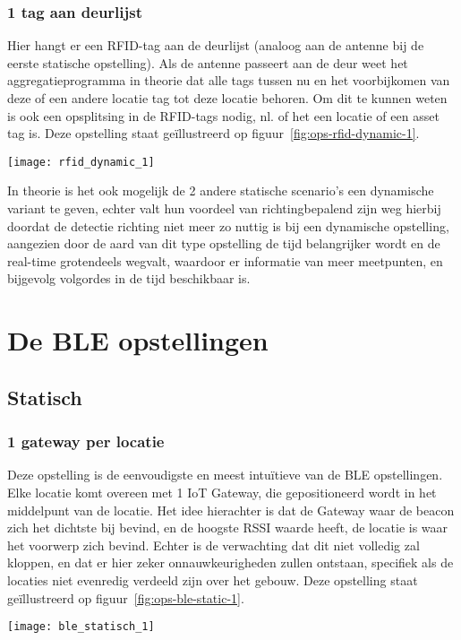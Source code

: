 \subsubsection{1 tag aan deurlijst}
\begin{minipage}{0.65\textwidth}
Hier hangt er een RFID-tag aan de deurlijst (analoog aan de antenne bij de eerste statische opstelling). Als de antenne passeert aan de deur weet het aggregatieprogramma in theorie dat alle tags tussen nu en het voorbijkomen van deze of een andere locatie tag tot deze locatie behoren. Om dit te kunnen weten is ook een opsplitsing in de RFID-tags nodig, nl. of het een locatie of een asset tag is. Deze opstelling staat geïllustreerd op figuur~\ref{fig:ops-rfid-dynamic-1}.
\end{minipage}
\hfill
\begin{minipage}{0.30\textwidth}
	\texttt{[image: rfid\_dynamic\_1]}
	\label{fig:ops-rfid-dynamic-1}
\end{minipage}

In theorie is het ook mogelijk de 2 andere statische scenario's een dynamische variant te geven, echter valt hun voordeel van richtingbepalend zijn weg hierbij doordat de detectie richting niet meer zo nuttig is bij een dynamische opstelling, aangezien door de aard van dit type opstelling de tijd belangrijker wordt en de real-time grotendeels wegvalt, waardoor er informatie van meer meetpunten, en bijgevolg volgordes in de tijd beschikbaar is.

\section[BLE]{De BLE opstellingen}
\label{sec:ops-ble}

\subsection{Statisch}

\subsubsection{1 gateway per locatie}
\begin{minipage}{0.65\textwidth}
Deze opstelling is de eenvoudigste en meest intuïtieve van de BLE opstellingen. Elke locatie komt overeen met 1 IoT Gateway, die gepositioneerd wordt in het middelpunt van de locatie. Het idee hierachter is dat de Gateway waar de beacon zich het dichtste bij bevind, en de hoogste RSSI waarde heeft, de locatie is waar het voorwerp zich bevind. Echter is de verwachting dat dit niet volledig zal kloppen, en dat er hier zeker onnauwkeurigheden zullen ontstaan, specifiek als de locaties niet evenredig verdeeld zijn over het gebouw. Deze opstelling staat geïllustreerd op figuur~\ref{fig:ops-ble-static-1}.
\end{minipage}
\hfill
\begin{minipage}{0.30\textwidth}
	\texttt{[image: ble\_statisch\_1]}
	\label{fig:ops-ble-static-1}
\end{minipage}

